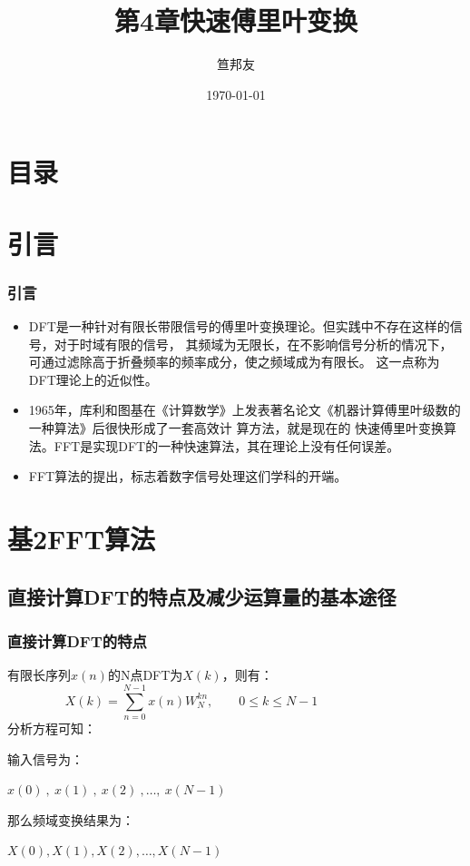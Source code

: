 \documentclass[notheorems,compress,mathserif,table]{beamer}
\title{\heiti 第4章\quad 快速傅里叶变换}
\author[\textcolor{blue}]{{\sihao\kaishu  笪邦友}}
\institute{\sihao\lishu  \textcolor{violet}{中南民族大学~~ 电子信息工程学院}}
\date{\fangsong\today}
\begin{document}
	\kaishu
	\frame{ \titlepage }
	\section*{目录}

\section{ 引言}
\begin{frame}\frametitle{引言}

\begin{itemize}
    \item DFT是一种针对有限长带限信号的傅里叶变换理论。但实践中不存在这样的信号，对于时域有限的信号，
          其频域为无限长，在不影响信号分析的情况下，可通过滤除高于折叠频率的频率成分，使之频域成为有限长。
          这一点称为DFT理论上的近似性。
    \item 1965年，库利和图基在《计算数学》上发表著名论文《机器计算傅里叶级数的一种算法》后很快形成了一套高效计
          算方法，就是现在的 快速傅里叶变换算法。FFT是实现DFT的一种快速算法，其在理论上没有任何误差。
    \item FFT算法的提出，标志着数字信号处理这们学科的开端。
\end{itemize}

\end{frame}

\section{ 基2FFT算法}
\subsection{直接计算DFT的特点及减少运算量的基本途径}
\begin{frame}\frametitle{直接计算DFT的特点}

    有限长序列$x(n)$的N点DFT为$X(k)$，则有：
    $$
    X(k)=\sum_{n=0}^{N-1}x(n)W_{N}^{kn},\qquad 0\leq k\leq N-1\quad\quad\quad\quad\quad\quad\quad
    $$
    分析方程可知：\par
    输入信号为：\par
    $x(0)\:,\:x(1)\:,\:x(2)\:,\ldots,\:x(N-1)$\par
    那么频域变换结果为：\par
    $X(0),X(1),X(2),\ldots,X(N-1)$\par

\end{frame}
\end{document}
